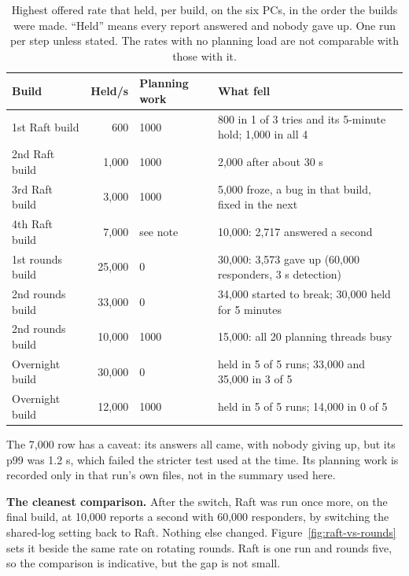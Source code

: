 \begin{table}[!htb]
\centering\small
\caption{Highest offered rate that held, per build, on the six PCs, in the order the builds were made. ``Held'' means every report answered and nobody gave up. One run per step unless stated. The rates with no planning load are not comparable with those with it.}
\label{tab:ladder}
\begin{tabularx}{\linewidth}{@{}P{2.4cm}rp{1.7cm}L@{}}
\toprule
Build & Held/s & Planning work & What fell \\
\midrule
1st Raft build & 600 & 1000 & 800 in 1 of 3 tries and its 5-minute hold; 1,000 in all 4 \\
2nd Raft build & 1,000 & 1000 & 2,000 after about 30 s \\
3rd Raft build & 3,000 & 1000 & 5,000 froze, a bug in that build, fixed in the next \\
4th Raft build & 7,000 & see note & 10,000: 2,717 answered a second \\
1st rounds build & 25,000 & 0 & 30,000: 3,573 gave up (60,000 responders, 3 s detection) \\
2nd rounds build & 33,000 & 0 & 34,000 started to break; 30,000 held for 5 minutes \\
2nd rounds build & 10,000 & 1000 & 15,000: all 20 planning threads busy \\
Overnight build & 30,000 & 0 & held in 5 of 5 runs; 33,000 and 35,000 in 3 of 5 \\
Overnight build & 12,000 & 1000 & held in 5 of 5 runs; 14,000 in 0 of 5 \\
\bottomrule
\end{tabularx}
\end{table}

The 7,000 row has a caveat: its answers all came, with nobody giving up, but its p99 was 1.2 s, which failed the stricter test used at the time. Its planning work is recorded only in that run's own files, not in the summary used here.

\textbf{The cleanest comparison.} After the switch, Raft was run once more, on the final build, at 10,000 reports a second with 60,000 responders, by switching the shared-log setting back to Raft. Nothing else changed. Figure~\ref{fig:raft-vs-rounds} sets it beside the same rate on rotating rounds. Raft is one run and rounds five, so the comparison is indicative, but the gap is not small.

